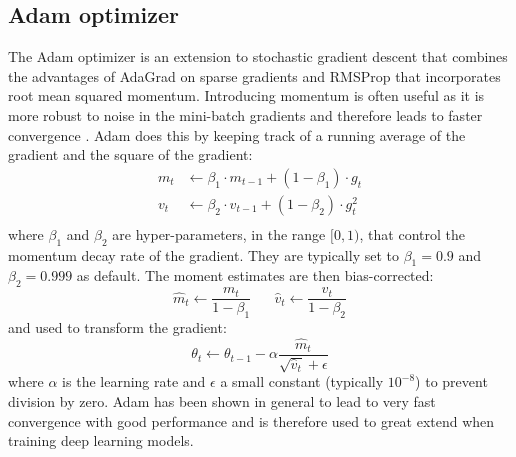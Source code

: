 \documentclass[a4paper,11pt]{article}
\begin{document}
\subsection{Adam optimizer}
The Adam optimizer \cite{kingma2014adam} is an extension to stochastic gradient descent that combines the advantages of AdaGrad \cite{duchi2011adaptive} on sparse gradients and RMSProp \cite{hinton2012rmsprop} that incorporates root mean squared momentum. Introducing momentum is often useful as it is more robust to noise in the mini-batch gradients and therefore leads to faster convergence \cite{QIAN1999145}. Adam does this by keeping track of a running average of the gradient and the square of the gradient:
\begin{equation}
  \begin{split}
    m_t &\leftarrow \beta_1 \cdot m_{t-1} + (1-\beta_1) \cdot g_t \\
    v_t &\leftarrow \beta_2 \cdot v_{t-1} + (1-\beta_2) \cdot g_t^2 \\
  \end{split}
\end{equation}
where $\beta_1$ and $\beta_2$ are hyper-parameters, in the range $[0, 1)$, that control the momentum decay rate of the gradient. They are typically set to $\beta_1 = 0.9$ and $\beta_2 = 0.999$ as default. The moment estimates are then bias-corrected:
\begin{equation}
    \hat{m}_t \leftarrow  \frac{m_t}{1-\beta_1} \hspace{20pt} \hat{v}_t \leftarrow \frac{v_t}{1-\beta_2}
\end{equation}
and used to transform the gradient:
\begin{equation}
  \theta_t \leftarrow \theta_{t-1} - \alpha \frac{\hat{m}_t}{\sqrt{\hat{v}_t} + \epsilon}
\end{equation}
where $\alpha$ is the learning rate and $\epsilon$ a small constant (typically $10^{-8}$) to prevent division by zero. Adam has been shown in general to lead to very fast convergence with good performance and is therefore used to great extend when training deep learning models. 

\end{document}
